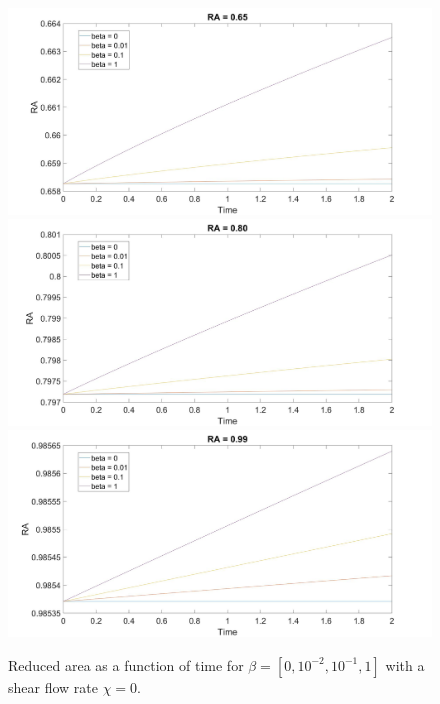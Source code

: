 \documentclass[aps,prl,showpacs]{revtex4}
\begin{document}
\begin{figure}
	\centering
	\includegraphics[width=.9\textwidth]{figures/1.jpg}
	\includegraphics[width=.9\textwidth]{figures/2.jpg}
	\includegraphics[width=.9\textwidth]{figures/3.jpg}
	\caption{Reduced area as a function of time for $\beta = [0, 10^{-2},10^{-1}, 1]$ with a shear flow rate $\chi = 0$.}
\end{figure}
\end{document}
